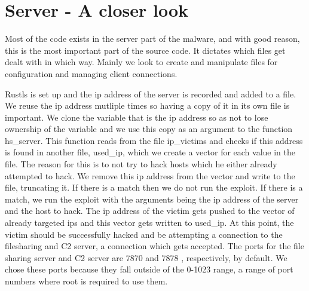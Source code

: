 \documentclass[../main.tex]{subfiles}
\begin{document}
	\section{Server -  A closer look}


Most of the code exists in the server part of the malware, and with good reason, this is the most important part of the source code. It dictates which files get dealt with in which way.
Mainly we look to create and manipulate files for configuration and managing client connections.

Rustls is set up and the ip address of the server is recorded and added to a file. We reuse the ip address mutliple times so having a copy of it in its own file is important. We clone
the variable that is the ip address so as not to lose ownership of the variable and we use this copy as an argument to the function hs_server. This function reads from the file 
ip_victims and checks if this address is found in another file, used_ip, which we create a vector for each value in the file. The reason for this is to not try to hack hosts which 
he either already attempted to hack. We remove this ip address from the vector and write to the file, truncating it. If there is a match then we do not run the exploit. If there is a
match, we run the exploit with the arguments being the ip address of the server and the host to hack. The ip address of the victim gets pushed to the vector of already targeted ips and
this vector gets written to used_ip. At this point, the victim should be successfully hacked and be attempting a connection to the filesharing and C2 server, a connection which 
gets accepted. The ports for the file sharing server and C2 server are 7870 and 7878 , respectively, by default. We chose these ports because they fall outside of the 0-1023 range,
a range of port numbers where root is required to use them.

	\vspace{10pt}
\end{document}
